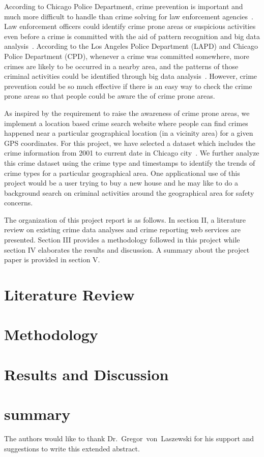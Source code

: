 According to Chicago Police Department, crime prevention is important
and much more difficult to handle than crime solving for law
enforcement agencies~\cite{hid-sp18-409-www-cpd}. Law enforcement
officers could identify crime prone areas or suspicious activities
even before a crime is committed with the aid of pattern recognition
and big data analysis~\cite{hid-sp18-409-nath2006crime,
hid-sp18-409-gera2014city}.  According to the Los Angeles Police
Department (LAPD) and Chicago Police Department (CPD), whenever a
crime was committed somewhere, more crimes are likely to be occurred
in a nearby area, and the patterns of those criminal activities could
be identified through big data analysis~\cite{hid-sp18-409-www-cpd,
hid-sp18-409-www-lapd}. However, crime prevention could be so much
effective if there is an easy way to check the crime prone areas so
that people could be aware the of crime prone areas.

As inspired by the requirement to raise the awareness of crime prone
areas, we implement a location based crime search website where people
can find crimes happened near a particular geographical location (in a
vicinity area) for a given GPS coordinates. For this project, we have
selected a dataset which includes the crime information from 2001 to
current date in Chicago city~\cite{hid-sp18-409-www-data.gov}. We
further analyze this crime dataset using the crime type and timestamps to
identify the trends of crime types for a particular
geographical area. One applicational use of this project would be a
user trying to buy a new house and he may like to do a background
search on criminal activities around the geographical area for safety
concerns.

The organization of this project report is as follows. In section II,
a literature review on existing crime data analyses and crime
reporting web services are presented. Section III provides a
methodology followed in this project while section IV elaborates the
results and discussion. A summary about the project paper is provided
in section V.

\section{Literature Review}

\section{Methodology}

\section{Results and Discussion}

\section{summary} 

\begin{acks}
	
The authors would like to thank Dr.~Gregor~von~Laszewski for his
support and suggestions to write this extended abstract.
	
\end{acks}


 
